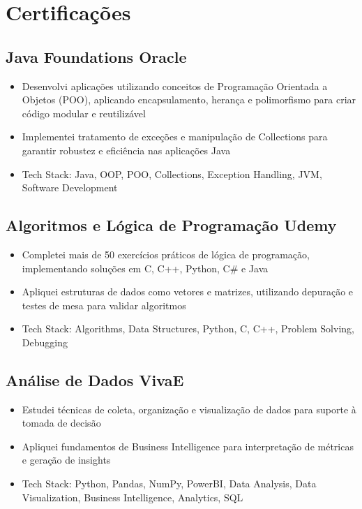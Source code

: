 \documentclass[a4paper,10pt]{article}
\begin{document}

\section{Certificações}

    \subsection*{\texorpdfstring{
            \textbf{Java Foundations} \hfill Oracle
        }{
            Java Foundations -- Oracle
        }}
        \begin{itemize}
            \item Desenvolvi aplicações utilizando conceitos de Programação Orientada a Objetos (POO), aplicando encapsulamento, herança e polimorfismo para criar código modular e reutilizável
            \item Implementei tratamento de exceções e manipulação de Collections para garantir robustez e eficiência nas aplicações Java
            \item Tech Stack: Java, OOP, POO, Collections, Exception Handling, JVM, Software Development
        \end{itemize}

    \subsection*{\texorpdfstring{
            \textbf{Algoritmos e Lógica de Programação} \hfill Udemy
        }{
            Algoritmos e Lógica de Programação -- Udemy
        }}
        \begin{itemize}
            \item Completei mais de 50 exercícios práticos de lógica de programação, implementando soluções em C, C++, Python, C\# e Java
            \item Apliquei estruturas de dados como vetores e matrizes, utilizando depuração e testes de mesa para validar algoritmos
            \item Tech Stack: Algorithms, Data Structures, Python, C, C++, Problem Solving, Debugging
        \end{itemize}

    \subsection*{\texorpdfstring{
            \textbf{Análise de Dados} \hfill VivaE
        }{
            Análise de Dados -- VivaE
        }}
        \begin{itemize}
            \item Estudei técnicas de coleta, organização e visualização de dados para suporte à tomada de decisão
            \item Apliquei fundamentos de Business Intelligence para interpretação de métricas e geração de insights
            \item Tech Stack: Python, Pandas, NumPy, PowerBI, Data Analysis, Data Visualization, Business Intelligence, Analytics, SQL
        \end{itemize}
\end{document}
